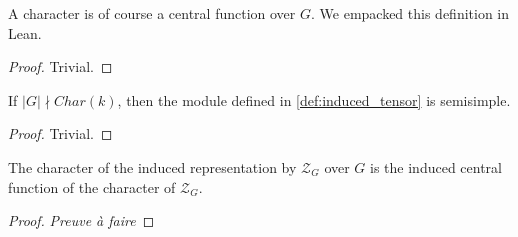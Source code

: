 \begin{definition}
    \label{def:char_central_fun}
    \leanok 
    A character is of course a central function over $G$. We empacked this definition
    in Lean.
    \begin{proof}
        \leanok
        Trivial.
    \end{proof}
\end{definition}

\begin{proposition}
    \label{prop:tensor_semi_simple}
    \leanok 
    If $|G|\nmid Char(k)$, then the module defined in \ref{def:induced_tensor} is semisimple.
    \begin{proof}
        \leanok
        Trivial.
    \end{proof}
\end{proposition}


\begin{proposition}
    \label{prop:induced_char}
    \leanok 
    The character of the induced representation by $\mathcal{Z}_G$ over $G$ is the induced 
    central function of the character of $\mathcal{Z}_G$.
\end{proposition}
\begin{proof}
    \textit{Preuve à faire}
\end{proof}